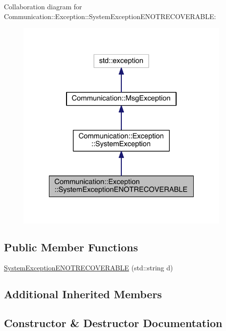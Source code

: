 Collaboration diagram for Communication\+:\+:Exception\+:\+:System\+Exception\+E\+N\+O\+T\+R\+E\+C\+O\+V\+E\+R\+A\+B\+L\+E\+:\nopagebreak
\begin{figure}[H]
\begin{center}
\leavevmode
\includegraphics[width=300pt]{class_communication_1_1_exception_1_1_system_exception_e_n_o_t_r_e_c_o_v_e_r_a_b_l_e__coll__graph}
\end{center}
\end{figure}
\subsection*{Public Member Functions}
\begin{DoxyCompactItemize}
\item 
\hyperlink{class_communication_1_1_exception_1_1_system_exception_e_n_o_t_r_e_c_o_v_e_r_a_b_l_e_aaf0a0742233948d4471dff5dd533cdc8}{System\+Exception\+E\+N\+O\+T\+R\+E\+C\+O\+V\+E\+R\+A\+B\+L\+E} (std\+::string d)
\end{DoxyCompactItemize}
\subsection*{Additional Inherited Members}


\subsection{Constructor \& Destructor Documentation}
\hypertarget{class_communication_1_1_exception_1_1_system_exception_e_n_o_t_r_e_c_o_v_e_r_a_b_l_e_aaf0a0742233948d4471dff5dd533cdc8}{}
